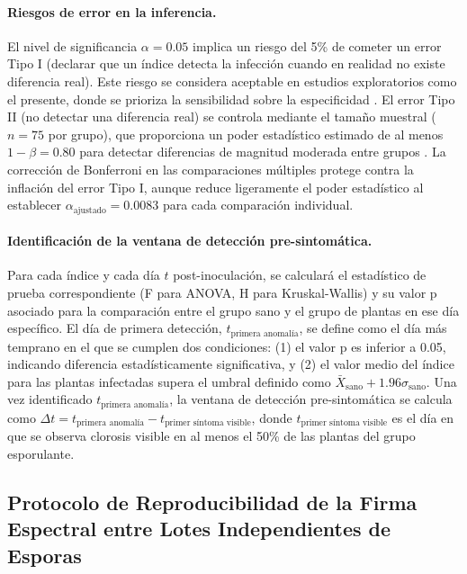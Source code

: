 \documentclass[12pt, a4paper]{article}
\begin{document}
	\paragraph{Riesgos de error en la inferencia.}
	El nivel de significancia $\alpha = 0.05$ implica un riesgo del 5\% de cometer un error Tipo I (declarar que un índice detecta la infección cuando en realidad no existe diferencia real). Este riesgo se considera aceptable en estudios exploratorios como el presente, donde se prioriza la sensibilidad sobre la especificidad \citep{Gold2020}. El error Tipo II (no detectar una diferencia real) se controla mediante el tamaño muestral ($n=75$ por grupo), que proporciona un poder estadístico estimado de al menos $1-\beta = 0.80$ para detectar diferencias de magnitud moderada entre grupos \citep{montgomery2017}. La corrección de Bonferroni en las comparaciones múltiples protege contra la inflación del error Tipo I, aunque reduce ligeramente el poder estadístico al establecer $\alpha_{\text{ajustado}} = 0.0083$ para cada comparación individual.
	
	\paragraph{Identificación de la ventana de detección pre-sintomática.}
	Para cada índice y cada día $t$ post-inoculación, se calculará el estadístico de prueba correspondiente (F para ANOVA, H para Kruskal-Wallis) y su valor p asociado para la comparación entre el grupo sano y el grupo de plantas en ese día específico. El día de primera detección, $t_{\text{primera anomalía}}$, se define como el día más temprano en el que se cumplen dos condiciones: (1) el valor p es inferior a 0.05, indicando diferencia estadísticamente significativa, y (2) el valor medio del índice para las plantas infectadas supera el umbral definido como $\bar{X}_{\text{sano}} + 1.96\sigma_{\text{sano}}$. Una vez identificado $t_{\text{primera anomalía}}$, la ventana de detección pre-sintomática se calcula como $\Delta t = t_{\text{primera anomalía}} - t_{\text{primer síntoma visible}}$, donde $t_{\text{primer síntoma visible}}$ es el día en que se observa clorosis visible en al menos el 50\% de las plantas del grupo esporulante.
	
	
	\subsection{Protocolo de Reproducibilidad de la Firma Espectral entre Lotes Independientes de Esporas}
	
\end{document}
